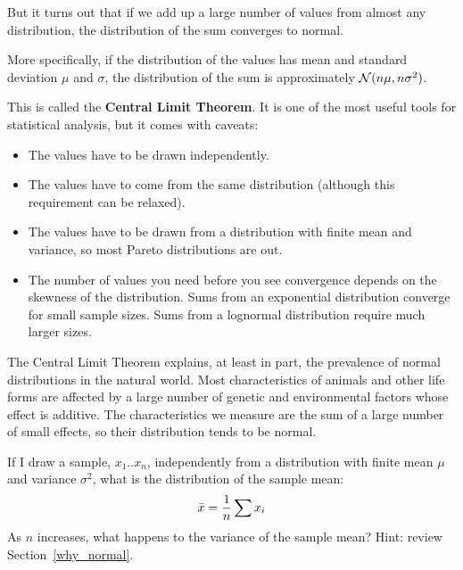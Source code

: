 \documentclass[12pt]{book}
\begin{document}
But it turns out that if we add up a large number of values from
almost any distribution, the distribution of the sum converges to
normal.

More specifically, if the distribution of the values has mean and
standard deviation $\mu$ and $\sigma$, the distribution of the sum is
approximately $\mathcal{N}(n \mu, n \sigma^2)$.

This is called the {\bf Central Limit Theorem}.  It is one of the
most useful tools for statistical analysis, but it comes with
caveats:

\begin{itemize}

\item The values have to be drawn independently.

\item The values have to come from the same distribution (although
  this requirement can be relaxed).

\item The values have to be drawn
  from a distribution with finite mean and variance, so most Pareto
  distributions are out.

\item The number of values you need before you see convergence depends
  on the skewness of the distribution.  Sums from an exponential
  distribution converge for small sample sizes.  Sums from a
  lognormal distribution require much larger sizes.

\end{itemize}

The Central Limit Theorem explains, at least in part, the prevalence
of normal distributions in the natural world.  Most characteristics of
animals and other life forms are affected by a large number of genetic
and environmental factors whose effect is additive.  The characteristics
we measure are the sum of a large number of small effects, so their
distribution tends to be normal.

\begin{exercise}
If I draw a sample, $x_{1} .. x_{n}$, independently from a
distribution with finite mean $\mu$ and variance $\sigma^2$, what is
the distribution of the sample mean:
%
\[ \bar{x} = \frac{1}{n} \sum x_i \]
%
As $n$ increases, what happens to the variance of the sample mean?
Hint: review Section~\ref{why_normal}.

\end{exercise}
\end{document}
